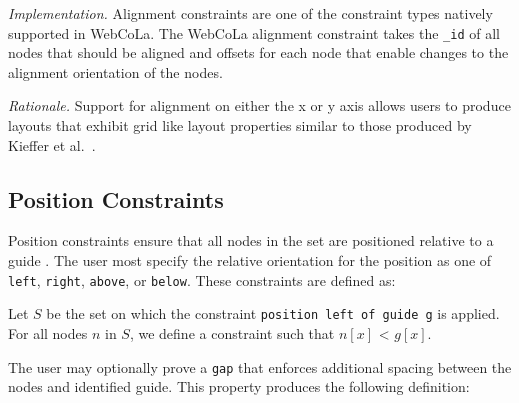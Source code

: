 \emph{Implementation.}
Alignment constraints are one of the constraint types natively supported in
WebCoLa. The WebCoLa alignment constraint takes the \texttt{\_id} of all nodes
that should be aligned and offsets for each node that enable changes to the
alignment orientation of the nodes.

\emph{Rationale.} Support for alignment on either the x or y axis allows
users to produce layouts that exhibit grid like layout properties similar
to those produced by Kieffer et al.\ \cite{kieffer2016hola}.



\subsection{Position Constraints}

Position constraints ensure that all nodes in the set are positioned relative to
a guide . The user most specify the relative
orientation for the position as one of \texttt{left}, \texttt{right}, 
\texttt{above}, or \texttt{below}. These constraints are defined as:

\begin{definition}
Let $S$ be the set on which the constraint \texttt{position left of guide g} is applied.
For all nodes $n$ in $S$, we define a constraint such that $n[x]$ < $g[x]$.
\end{definition}

The user may optionally prove a \texttt{gap} that enforces additional spacing
between the nodes and identified guide. This property produces the following
definition:

